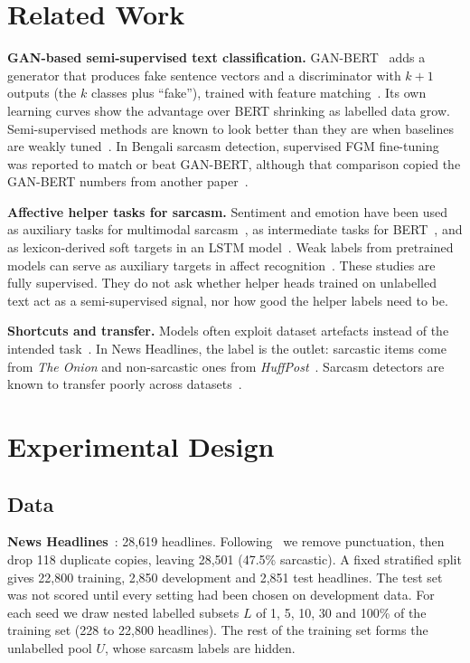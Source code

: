 \documentclass[conference]{IEEEtran}
\begin{document}
\section{Related Work}

\textbf{GAN-based semi-supervised text classification.} GAN-BERT~\cite{croce2020ganbert} adds a generator that produces fake sentence vectors and a discriminator with $k{+}1$ outputs (the $k$ classes plus ``fake''), trained with feature matching~\cite{salimans2016improved}. Its own learning curves show the advantage over BERT shrinking as labelled data grow. Semi-supervised methods are known to look better than they are when baselines are weakly tuned~\cite{oliver2018realistic}. In Bengali sarcasm detection, supervised FGM fine-tuning was reported to match or beat GAN-BERT, although that comparison copied the GAN-BERT numbers from another paper~\cite{zihan2026fgm}.

\textbf{Affective helper tasks for sarcasm.} Sentiment and emotion have been used as auxiliary tasks for multimodal sarcasm~\cite{chauhan2020sentiment}, as intermediate tasks for BERT~\cite{savini2022intermediate}, and as lexicon-derived soft targets in an LSTM model~\cite{chen2022jointly}. Weak labels from pretrained models can serve as auxiliary targets in affect recognition~\cite{dai2021weakly}. These studies are fully supervised. They do not ask whether helper heads trained on unlabelled text act as a semi-supervised signal, nor how good the helper labels need to be.

\textbf{Shortcuts and transfer.} Models often exploit dataset artefacts instead of the intended task~\cite{gururangan2018annotation,geirhos2020shortcut}. In News Headlines, the label is the outlet: sarcastic items come from \textit{The Onion} and non-sarcastic ones from \textit{HuffPost}~\cite{misra2023sarcasm}. Sarcasm detectors are known to transfer poorly across datasets~\cite{jang2024generalizable}.

\section{Experimental Design}

\subsection{Data}
\textbf{News Headlines}~\cite{misra2023sarcasm}: 28,619 headlines. Following~\cite{irfan2025seed} we remove punctuation, then drop 118 duplicate copies, leaving 28,501 (47.5\% sarcastic). A fixed stratified split gives 22,800 training, 2,850 development and 2,851 test headlines. The test set was not scored until every setting had been chosen on development data. For each seed we draw nested labelled subsets $L$ of 1, 5, 10, 30 and 100\% of the training set (228 to 22,800 headlines). The rest of the training set forms the unlabelled pool $U$, whose sarcasm labels are hidden.
\end{document}
